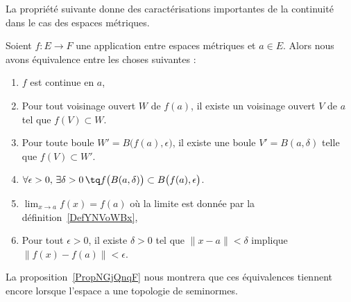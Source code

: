 La propriété suivante donne des caractérisations importantes de la continuité dans le cas des espaces métriques.
\begin{proposition} \label{PropQZRNpMn}
	Soient \( f\colon E\to F\) une application entre espaces métriques et \( a\in E\). Alors nous avons équivalence entre les choses suivantes :
	\begin{enumerate}
		\item\label{ItemCBUoRWJi}
		      \( f\) est continue en \( a\),
		\item\label{ItemCBUoRWJii}
		      Pour tout voisinage ouvert \( W\) de \( f(a)\), il existe un voisinage ouvert \( V\) de \( a\) tel que \( f(V)\subset W\).
		\item\label{ItemCBUoRWJiii}
		      Pour toute boule \( W'=B\big( f(a),\epsilon \big)\), il existe une boule \( V'=B(a,\delta)\) telle que \( f(V)\subset W'\).
		\item\label{ItemCBUoRWJiv}
		      \( \forall \epsilon>0,\,\exists \delta>0\,\tq f\big( B(a,\delta) \big)\subset B\big( f(a),\epsilon \big)\).
		\item\label{ItemYNQpikrii}
		      \( \lim_{x\to a}f(x)=f(a)\) où la limite est donnée par la définition~\ref{DefYNVoWBx},
		\item\label{ItemYNQpikriii}
		      Pour tout \( \epsilon>0\), il existe \( \delta>0\) tel que \( \| x-a \|<\delta\) implique \( \| f(x)-f(a) \|<\epsilon\).
	\end{enumerate}
\end{proposition}
La proposition~\ref{PropNGjQnqF} nous montrera que ces équivalences tiennent encore lorsque l'espace a une topologie de seminormes.

